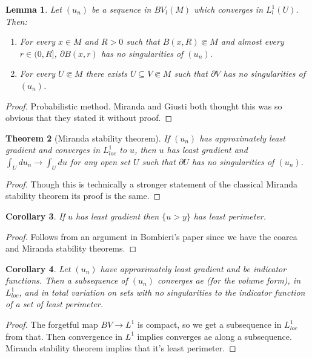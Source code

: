 \documentclass[reqno,12pt,letterpaper]{amsart}
\newtheorem{theorem}{Theorem}[section]
\newtheorem{lemma}[theorem]{Lemma}
\newtheorem{corollary}[theorem]{Corollary}
\theoremstyle{definition}
\numberwithin{equation}{section}
\begin{document}
\begin{lemma}
Let $(u_n)$ be a sequence in $BV_l(M)$ which converges in $L^1_l(U)$. Then:
\begin{enumerate}
\item \label{probabilistic balls} For every $x \in M$ and $R > 0$ such that $B(x, R) \Subset M$ and almost every $r \in (0, R]$, $\partial B(x, r)$ has no singularities of $(u_n)$.
\item \label{probabilistic hypersurfaces} For every $U \Subset M$ there exists $U \subseteq V \Subset M$ such that $\partial V$ has no singularities of $(u_n)$.
\end{enumerate}
\end{lemma}
\begin{proof}
Probabilistic method. Miranda and Giusti both thought this was so obvious that they stated it without proof.
\end{proof}

\begin{theorem}[Miranda stability theorem]
If $(u_n)$ has approximately least gradient and converges in $L^1_{loc}$ to $u$, then $u$ has least gradient and $\int_U du_n \to \int_U du$ for any open set $U$ such that $\partial U$ has no singularities of $(u_n)$.
\end{theorem}
\begin{proof}
Though this is technically a stronger statement of the classical Miranda stability theorem its proof is the same.
\end{proof}

\begin{corollary}
If $u$ has least gradient then $\{u > y\}$ has least perimeter.
\end{corollary}
\begin{proof}
Follows from an argument in Bombieri's paper since we have the coarea and Miranda stability theorems.
\end{proof}

\begin{corollary}
Let $(u_n)$ have approximately least gradient and be indicator functions.
Then a subsequence of $(u_n)$ converges ae (for the volume form), in $L^1_{loc}$, and in total variation on sets with no singularities to the indicator function of a set of least perimeter.
\end{corollary}
\begin{proof}
The forgetful map $BV \to L^1$ is compact, so we get a subsequence in $L^1_{loc}$ from that.
Then convergence in $L^1$ implies converges ae along a subsequence.
Miranda stability theorem implies that it's least perimeter.
\end{proof}
\end{document}
